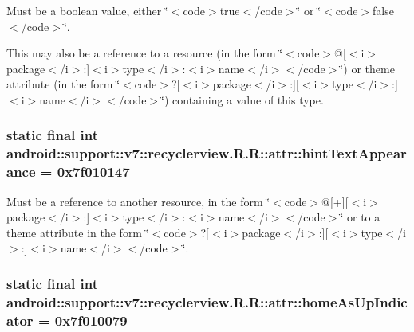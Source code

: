 Must be a boolean value, either \char`\"{}$<$code$>$true$<$/code$>$\char`\"{} or \char`\"{}$<$code$>$false$<$/code$>$\char`\"{}. 

This may also be a reference to a resource (in the form \char`\"{}$<$code$>$@\mbox{[}$<$i$>$package$<$/i$>$:\mbox{]}$<$i$>$type$<$/i$>$:$<$i$>$name$<$/i$>$$<$/code$>$\char`\"{}) or theme attribute (in the form \char`\"{}$<$code$>$?\mbox{[}$<$i$>$package$<$/i$>$:\mbox{]}\mbox{[}$<$i$>$type$<$/i$>$:\mbox{]}$<$i$>$name$<$/i$>$$<$/code$>$\char`\"{}) containing a value of this type. \hypertarget{classandroid_1_1support_1_1v7_1_1recyclerview_1_1_r_1_1attr_15e3b04c6e5b26e27da51758beaa0579}{
\subsubsection[{hintTextAppearance}]{\setlength{\rightskip}{0pt plus 5cm}static final int android::support::v7::recyclerview.R.R::attr::hintTextAppearance = 0x7f010147}}
\label{classandroid_1_1support_1_1v7_1_1recyclerview_1_1_r_1_1attr_15e3b04c6e5b26e27da51758beaa0579}


Must be a reference to another resource, in the form \char`\"{}$<$code$>$@\mbox{[}+\mbox{]}\mbox{[}$<$i$>$package$<$/i$>$:\mbox{]}$<$i$>$type$<$/i$>$:$<$i$>$name$<$/i$>$$<$/code$>$\char`\"{} or to a theme attribute in the form \char`\"{}$<$code$>$?\mbox{[}$<$i$>$package$<$/i$>$:\mbox{]}\mbox{[}$<$i$>$type$<$/i$>$:\mbox{]}$<$i$>$name$<$/i$>$$<$/code$>$\char`\"{}. \hypertarget{classandroid_1_1support_1_1v7_1_1recyclerview_1_1_r_1_1attr_b32832af03911966ed40e4bf3d8b3cd2}{
\subsubsection[{homeAsUpIndicator}]{\setlength{\rightskip}{0pt plus 5cm}static final int android::support::v7::recyclerview.R.R::attr::homeAsUpIndicator = 0x7f010079}}
\label{classandroid_1_1support_1_1v7_1_1recyclerview_1_1_r_1_1attr_b32832af03911966ed40e4bf3d8b3cd2}


